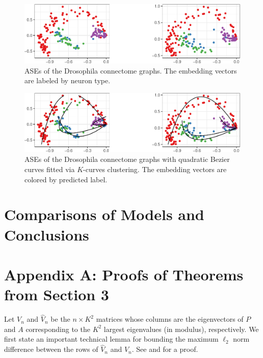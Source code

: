 \documentclass[
  12pt,
]{article}
\theoremstyle{definition}
\theoremstyle{definition}
\theoremstyle{definition}
\theoremstyle{definition}
\theoremstyle{remark}
\begin{document}
\begin{figure}[H]

{\centering \includegraphics{draft_files/figure-latex/mbconnectome-ase-1} 

}

\caption{ASEs of the Drosophila connectome graphs. The embedding vectors are labeled by neuron type.}\label{fig:mbconnectome-ase}
\end{figure}

\begin{figure}[H]

{\centering \includegraphics{draft_files/figure-latex/mbconnectome-kcurves-1} 

}

\caption{ASEs of the Drosophila connectome graphs with quadratic Bezier curves fitted via $K$-curves clustering. The embedding vectors are colored by predicted label.}\label{fig:mbconnectome-kcurves}
\end{figure}

\hypertarget{sec:comparison}{%
\section{Comparisons of Models and Conclusions}\label{sec:comparison}}

\newpage

\section*{Appendix A: Proofs of Theorems from Section 3}

Let \(V_n\) and \(\hat{V}_n\)
be the \(n \times K^2\) matrices whose columns are the eigenvectors of \(P\) and \(A\) corresponding to the
\(K^2\) largest eigenvalues (in modulus), respectively.
We first state an important technical lemma for bounding the maximum
\(\ell_2\) norm difference between the rows of \(\hat{V}_n\) and
\(V_n\). See \citet{cape_biometrika} and
\citet[Lemma~5]{rubindelanchy2017statistical} for a proof.
\end{document}
